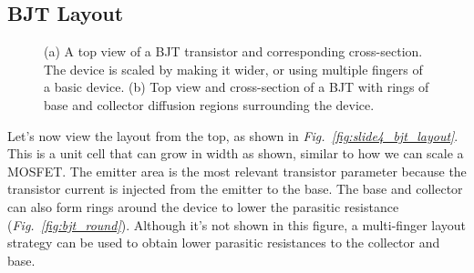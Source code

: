 \subsection{BJT Layout}
\begin{figure}[tb]
\centering
{}
\hspace{1cm}
\caption{(a) A top view of a BJT transistor and corresponding cross-section.  The device is scaled by making it wider, or using multiple fingers of a basic device.  (b) Top view and cross-section of a BJT with rings of base and collector diffusion regions surrounding the device.} 
\end{figure}
Let's now view the layout from the top, as shown in \emph{Fig.~\ref{fig:slide4_bjt_layout}}.  This is a unit cell that can grow in width as shown, similar to how we can scale a MOSFET.  The emitter area is the most relevant transistor parameter because the transistor current is injected from the emitter to the base.  The base and collector can also form rings around the device to lower the parasitic resistance (\emph{Fig.~\ref{fig:bjt_round}}).  Although it's not shown in this figure, a multi-finger layout strategy can be used to obtain lower parasitic resistances to the collector and base.  
